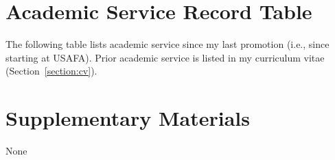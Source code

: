 \documentclass[11pt,titlepage]{article}
\begin{document}
\section{Academic Service Record Table}  %
The following table lists academic service since my last promotion (i.e., since starting at \gls{USAFA}).
Prior academic service is listed in my curriculum vitae (Section~\ref{section:cv}).



\section{Supplementary Materials}  %

None




\end{document}
